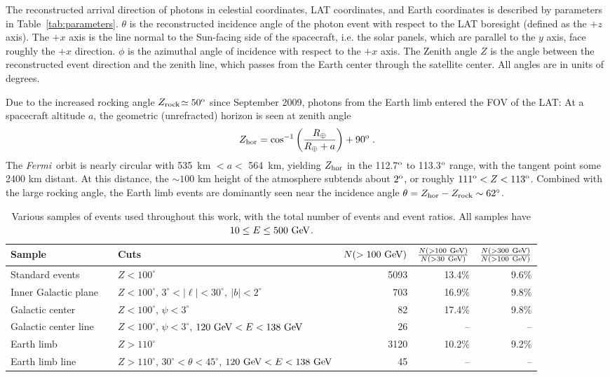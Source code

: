 \documentclass[aps,twocolumn,prd,superscriptaddress,showpacs,nofootinbib,fixfloat]{revtex4}
\newcommand{\be}{\begin{equation}}
\newcommand{\ee}{\end{equation}}
\newcommand{\Fermi}{{\slshape Fermi}}
\newcommand{\GeV}{{\rm ~GeV}}
\newcommand{\degree}{^{\rm o}}
\newcommand{\zrock}{$Z_{\rm rock}$}
\begin{document}
The reconstructed arrival direction of photons in celestial coordinates, LAT
coordinates, and Earth coordinates is described by parameters in 
Table~\ref{tab:parameters}.  $\theta$ is the reconstructed incidence angle of
the photon event with respect to the LAT boresight (defined as the $+z$ axis).
The $+x$ axis is the line normal to the Sun-facing side of the spacecraft,
i.e. the solar panels, which are parallel to the $y$ axis, face roughly the $+x$ direction.   $\phi$ is the
azimuthal angle of incidence with respect to the $+x$ axis.
The Zenith angle $Z$ is the angle between the
reconstructed event direction and the zenith line, which passes from the
Earth center through the satellite center.  All angles are in units of
degrees.

Due to the increased rocking angle \zrock$\simeq50\degree$
since September 2009, photons from the Earth limb 
entered the FOV of the LAT:
%
At a spacecraft altitude $a$, the geometric (unrefracted) horizon is seen at zenith angle \be
Z_{\rm hor} = \cos^{-1}\left(\frac{R_\oplus}{R_\oplus+a}\right)+90\degree\;. \ee
The \Fermi\ orbit is nearly circular with 535~km $< a <$ 564~km, yielding
$Z_{\rm hor}$ in the 112.7$\degree$ to 113.3$\degree$ range, with the tangent
point some 2400 km distant.  At this distance, the $\sim 100$ km height of the
atmosphere subtends about $2\degree$, or roughly $111\degree < Z <
113\degree$. Combined with the large rocking angle, the Earth limb events are
dominantly seen near the incidence angle $\theta=Z_{\rm hor}-Z_{\rm rock}\sim 62^\circ$.
\medskip

\begin{table}
  \begin{tabular}{lllrrr}
    \hline
    Sample &&Cuts & $N(>100\GeV)$ & $\frac{N(>100\GeV)}{N(>30\GeV)}$ & $\frac{N(>300\GeV)}{N(>100\GeV)}$\\
    \hline
    Standard events      &  & $Z<100^\circ$ & 5093 & 13.4\% & 9.6\% \\
    Inner Galactic plane &  & $Z<100^\circ$, $3^\circ < |\ell| < 30^\circ,\ |b|<2^\circ$     & 703 & 16.9\% & 9.8\% \\
    Galactic center      &  & $Z<100^\circ$, $\psi<3^\circ$ & 82 & 17.4\% & 9.8\% \\
    Galactic center line &  & $Z<100^\circ$, $\psi<3^\circ$, $120\GeV<E<138\GeV$             & 26 & -- & -- \\
    Earth limb           &  & $Z>110^\circ$ & 3120 & 10.2\% & 9.2\% \\
    Earth limb line      &  & $Z>110^\circ$, $30^\circ<\theta<45^\circ$, $120\GeV<E<138\GeV$ & 45 & -- & -- \\ 
    \hline
  \end{tabular}
  \caption{Various samples of events used throughout this work, with 
    the total number of events and event ratios.
    All samples have $10\leq E\leq500\GeV$.}
  \label{tab:regions}
\end{table}
\end{document}
